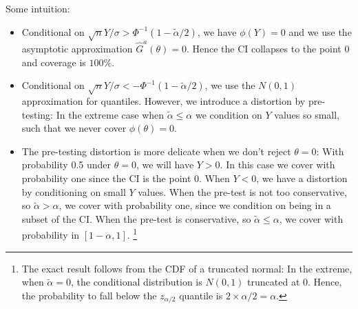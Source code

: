 \documentclass[12pt,a4paper,english]{article} %
\numberwithin{equation}{section}
\theoremstyle{definition}
\theoremstyle{remark}
\theoremstyle{plain}
\begin{document}
Some intuition:
\begin{itemize}
  \item Conditional on $\sqrt{n}Y/\sigma > \Phi^{-1}(1-\tilde{\alpha}/2)$, we have $\phi(Y) = 0$ and we use the asymptotic approximation $\hat{G}^a(\theta) = 0$. Hence the CI collapses to the point $0$ and coverage is $100\%$.
  \item Conditional on $\sqrt{n}Y/\sigma < -\Phi^{-1}(1-\tilde{\alpha}/2)$, we use the $N(0,1)$ approximation for quantiles. However, we introduce a distortion by pre-testing: In the extreme case when $\tilde{\alpha} \leq \alpha$ we condition on $Y$ values so small, such that we never cover $\phi(\theta)=0$.
  \item The pre-testing distortion is more delicate when we don't reject $\theta=0$: With probability 0.5 under $\theta=0$, we will have $Y>0$. In this case we cover with probability one since the CI is the point $0$.
  When $Y<0$, we have a distortion by conditioning on small $Y$ values. When the pre-test is not too conservative, so $\tilde{\alpha} > \alpha$, we cover with probability one, since we condition on being in a subset of the CI.\@
  When the pre-test is conservative, so $\tilde{\alpha} \leq \alpha$, we cover with probability in $[1-\alpha, 1]$.
\footnote{The exact result follows from the CDF of a truncated normal: In the extreme, when $\tilde{\alpha} = 0$, the conditional distribution is $N(0,1)$ truncated at $0$.
  Hence, the probability to fall below the $z_{\alpha/2}$ quantile is $2\times\alpha/2 = \alpha$.
}
\end{itemize}



\end{document}
